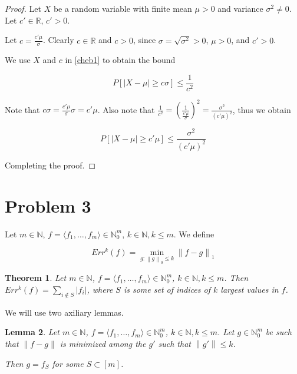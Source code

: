 \documentclass[11pt]{amsart}
\newtheorem{theorem}{Theorem}[section]
\newtheorem{lemma}[theorem]{Lemma}
\newenvironment{definition}[1][Definition]{\begin{trivlist}
\item[\hskip \labelsep {\bfseries #1}]}{\end{trivlist}}
\newcommand{\norm}[1]{\left\lVert #1 \right\rVert}
\begin{document}
\begin{proof}
Let $X$ be a random variable with finite mean $\mu > 0$ and variance $\sigma^2 \ne 0$. Let $c' \in \mathbb{R}$, $c' > 0$.

Let $c = \frac{c' \mu}{\sigma}$. Clearly $c \in \mathbb{R}$ and $c > 0$, since $\sigma = \sqrt{\sigma^2} > 0$, $\mu > 0$, and $c' > 0$.

We use $X$ and $c$ in \ref{cheb1} to obtain the bound

$$
P\left[|X - \mu| \ge c \sigma\right] \le \frac{1}{c^2}
$$

Note that $c \sigma = \frac{c' \mu}{\sigma} \sigma = c' \mu$. Also note that $\frac{1}{c^2} = \left(\frac{1}{\frac{c' \mu}{\sigma}}\right)^2 = \frac{\sigma^2}{(c' \mu)^2}$, thus we obtain

$$
P\left[|X - \mu| \ge c' \mu\right] \le \frac{\sigma^2}{(c' \mu)^2}
$$

Completing the proof.
\end{proof}



\section*{Problem 3}
\addtocounter{section}{1}
\setcounter{theorem}{0}

\begin{definition}
Let $m \in \mathbb{N}$, $f = \langle f_1, \dots, f_m \rangle \in \mathbb{N}_0^m$, $k \in \mathbb{N}, k \le m$. We define

$$
Err^k(f) = \min_{g : \norm{g}_0 \le k}{\norm{f - g}_1}
$$
\end{definition}

\begin{theorem}
Let $m \in \mathbb{N}$, $f = \langle f_1, \dots, f_m \rangle \in \mathbb{N}_0^m$, $k \in \mathbb{N}, k \le m$. Then $Err^k(f) = \sum_{i \not\in S} |f_i|$, where $S$ is some set of indices of $k$ largest values in $f$.
\end{theorem}

We will use two axiliary lemmas.

\begin{lemma}\label{lemS1}
Let $m \in \mathbb{N}$, $f = \langle f_1, \dots, f_m \rangle \in \mathbb{N}_0^m$, $k \in \mathbb{N}, k \le m$. Let $g \in \mathbb{N}_0^m$ be such that $\norm{f - g}$ is minimized among the $g'$ such that $\norm{g'} \le k$.

Then $g = f_S$ for some $S \subset [m]$.
\end{lemma}
\end{document}
